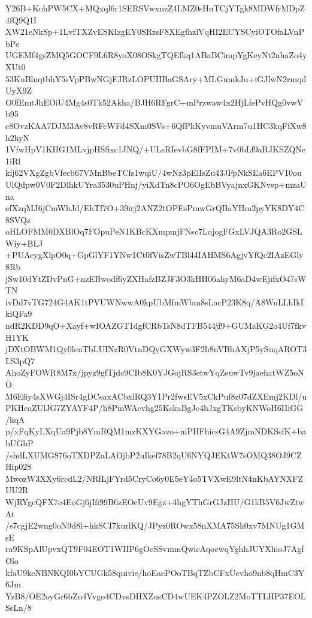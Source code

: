 Y26B+KohPW5CX+MQxql6r1SERSVwxnzZ4LMZ0sHuTCjYTgk8MDWfrMDpZ4fQ9Q1I
XW21eNkSp+1LvfTXZvESKIzgEY0SRzsF8XEgfhzlVqHI2ECYSCyiOTOfaLVnPbPe
UGEMf4gsZMQ5GOCF9L6R8yoX08OSkgTQEfkq1ABaBCimpYgKeyNt2nhaZo4yXUt0
53KuBlnqtbhY5sVpPBwNGjFJRzLOPUHBaGSAry+MLGumkJu+iGJlwN2rmqdUyX9Z
O0fEmtJhEOiU4Mg4s0Tk52Akha/BJH6RFgrC+mPrzwaw4x2HjLfePvHQg0vwVb95
e8OvzKAA7DJM3Av8vRFcWFd4SXm0SVs+6QfPkKyvmuVArm7u1HC3kqFfXw8h2hyN
1VfwHpV1KHG1MLvjpHSSxc1JNQ/+ULsRIevbG8fFPIM+7v0bLf9aRJKSZQNe1iRl
kij62VXgZgbVfecb67VMnBbeTCfs1wqiU/4wNz3pElIsZu43JFpNkSEa6EPV10ou
UlQdpw0V0F2DlhkUYra3530uPHnj/yiXdTn8cPO6OgEbBVyajnxGKNvsp+mzaUna
efXzqMJ6jCmWhJd/EhTf7O+39irj2ANZ2tOPEsPmwGrQBaYHm2pyYK8DY4C8SVQz
oHLOFMM0DXBlOq7FOpuPeN1KBcKXmpmjFNsc7LojogFGxLVJQA3Ro2GSLWiy+BLJ
+PUAeygXlpO0q+GpGlYF1YNw1Ct0fVisZwTBl44IAHMS6AgjvYfQc2IAzEGly8Rb
jSw10dYtZDvPnG+nzEBwodf6yZXHafzBZJF3O3kHH06ahyM6aD4wEjifxO47sWTN
ivDd7vTG724G4AK1tPVUWNwwA0kpUbMfmWbm8sLacP23K8q/A8WuLLhIkIkiQFa9
ndR2KDD9qO+Xayf+wIOAZGT1dgfCRbTsN8dTFB544jf9+GUMaKG2o4Uf7fkvH1YK
jDXtOBWM1Qy0lenTbLUINzR0VtnDQyGXWyw3F2h8nVBhAXjP5ySuqAROT3LS3pQ7
AhoZyFOWR8M7x/jpyz9gfTjdc9CIb8K0YJGojRS3etwYqZeuwTv9jaehatWZ5oNO
M6Efiy4sXWGj4ISr4gDCsaxACbxlRQ3Y1Pr2fwsEV5xCkPuf8z07dZXEmj2KDl/u
PKHeaZUlJG7ZYAYF4P/h8PmWAcvhg25KskaBgJc4hJxgTKsbyKNWoH6IIiGG/kqA
p/xFqKyLXqUa9Pjb8YmRQM1mzKXYGavo+niPHFhicsG4A9ZjmNDKSsfK+babUGbP
/shdLXUMG876oTXDPZaLAOjbP2uIkef78B2qU6NYQJEKtW7sOMQ38OJ9CZHip02S
MwozW3XXy6rcdL2/NRfLjFYrd5CryCo6y0E5eY4o5TVXwE9ltN4nKbAYNXFZUU2R
WjRYgeQFX7e4EoGj6jIfi99B6zEOcUv9Egz+4hgYThGrGJzHU/G1kB5V6JwZtwAt
/s7cgjE2wng0oN9d8l+hkSCI7kurlKQ/JPyz0ROwx58nXMA75Sh0xv7MNUg1GMsE
ra9KSpAlUpvxQT9F04EOT1WIIP6gOeSSvmmQwicAqoewqYghhJUYXhioJ7AgfOlo
kfaU9keNBNKQI0bYCUGk58quivie/hoEaePOoTBqTZbCFxUcvho9nb8qHmC3Y6Jm
YzB8/OE2oyGr6bZu4Vvgo4CDvsDHXZusCD4wUEK4PZOLZ2MoTTLHP37EOLSsLn/8

